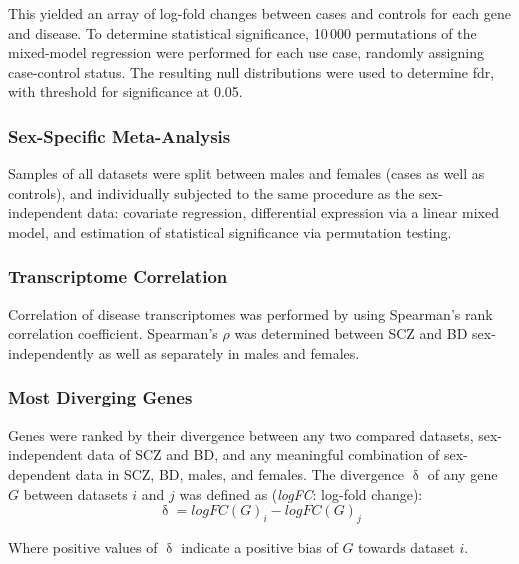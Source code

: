 \begin{method}
This yielded an array of log-fold changes between cases and controls for each gene and disease. To determine statistical significance, 10\,000 permutations of the mixed-model regression were performed for each use case, randomly assigning case-control status. The resulting null distributions were used to determine \ac{fdr}, with threshold for significance at 0.05. 

\subsubsection{Sex-Specific Meta-Analysis}
Samples of all datasets were split between males and females (cases as well as controls), and individually subjected to the same procedure as the sex-independent data: covariate regression, differential expression via a linear mixed model, and estimation of statistical significance via permutation testing.

\subsubsection{Transcriptome Correlation}
Correlation of disease transcriptomes was performed by using Spearman's rank correlation coefficient. Spearman's $\rho$ was determined between SCZ and BD sex-independently as well as separately in males and females.

\subsubsection{Most Diverging Genes}
Genes were ranked by their divergence between any two compared datasets, sex-independent data of SCZ and BD, and any meaningful combination of sex-dependent data in SCZ, BD, males, and females. The divergence $\updelta$ of any gene $G$ between datasets $i$ and $j$ was defined as (\emph{logFC}: log-fold change): $$\updelta = logFC(G)_i - logFC(G)_j$$

Where positive values of $\updelta$ indicate a positive bias of $G$ towards dataset $i$.

\end{method}

